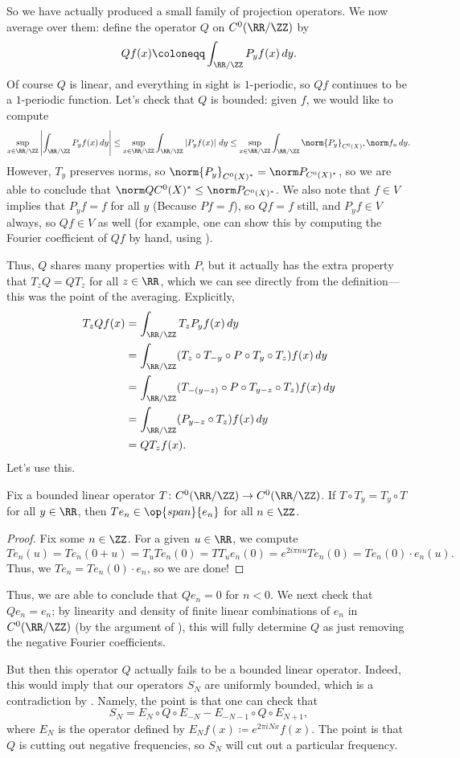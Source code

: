 \documentclass[../notes.tex]{subfiles}
\begin{document}
So we have actually produced a small family of projection operators. We now average over them: define the operator $Q$ on $C^0(\RR/\ZZ)$ by
\[Qf(x)\coloneqq\int_{\RR/\ZZ}P_yf(x)\,dy.\]
Of course $Q$ is linear, and everything in sight is $1$-periodic, so $Qf$ continues to be a $1$-periodic function. Let's check that $Q$ is bounded: given $f$, we would like to compute
\[\sup_{x\in\RR/\ZZ}\left|\int_{\RR/\ZZ}P_yf(x)\,dy\right|\le\sup_{x\in\RR/\ZZ}\int_{\RR/\ZZ}\left|P_yf(x)\right|\,dy\le\sup_{x\in\RR/\ZZ}\int_{\RR/\ZZ}\norm{P_y}_{C^0(X)^*}\norm f_u\,dy.\]
However, $T_y$ preserves norms, so $\norm{P_y}_{C^0(X)^*}=\norm P_{C^0(X)^*}$, so we are able to conclude that $\norm Q{C^0(X)^*}\le\norm P_{C^0(X)^*}$. We also note that $f\in V$ implies that $P_yf=f$ for all $y$ (Because $Pf=f$), so $Qf=f$ still, and $P_yf\in V$ always, so $Qf\in V$ as well (for example, one can show this by computing the Fourier coefficient of $Qf$ by hand, using ).

Thus, $Q$ shares many properties with $P$, but it actually has the extra property that $T_zQ=QT_z$ for all $z\in\RR$, which we can see directly from the definition---this was the point of the averaging. Explicitly,
\begin{align*}
	T_zQf(x) &= \int_{\RR/\ZZ}T_zP_yf(x)\,dy \\
	&= \int_{\RR/\ZZ}(T_z\circ T_{-y}\circ P\circ T_y\circ T_z)f(x)\,dy \\
	&= \int_{\RR/\ZZ}(T_{-(y-z)}\circ P\circ T_{y-z}\circ T_z)f(x)\,dy \\
	&= \int_{\RR/\ZZ}(P_{y-z}\circ T_z)f(x)\,dy \\
	&= QT_zf(x).
\end{align*}
Let's use this.
\begin{lemma}
	Fix a bounded linear operator $T\colon C^0(\RR/\ZZ)\to C^0(\RR/\ZZ)$. If $T\circ T_y=T_y\circ T$ for all $y\in\RR$, then $Te_n\in\op{span}\{e_n\}$ for all $n\in\ZZ$.
\end{lemma}
\begin{proof}
	Fix some $n\in\ZZ$. For a given $u\in\RR$, we compute
	\[Te_n(u)=Te_n(0+u)=T_uTe_n(0)=TT_ue_n(0)=e^{2i\pi nu}Te_n(0)=Te_n(0)\cdot e_n(u).\]
	Thus, we $Te_n=Te_n(0)\cdot e_n$, so we are done!
\end{proof}
Thus, we are able to conclude that $Qe_n=0$ for $n<0$. We next check that $Qe_n=e_n$; by linearity and density of finite linear combinations of $e_n$ in $C^0(\RR/\ZZ)$ (by the argument of ), this will fully determine $Q$ as just removing the negative Fourier coefficients.

But then this operator $Q$ actually fails to be a bounded linear operator. Indeed, this would imply that our operators $S_N$ are uniformly bounded, which is a contradiction by . Namely, the point is that one can check that
\[S_N=E_N\circ Q\circ E_{-N}-E_{-N-1}\circ Q\circ E_{N+1},\]
where $E_N$ is the operator defined by $E_Nf(x)\coloneqq e^{2\pi iNx}f(x)$. The point is that $Q$ is cutting out negative frequencies, so $S_N$ will cut out a particular frequency.
\end{document}
